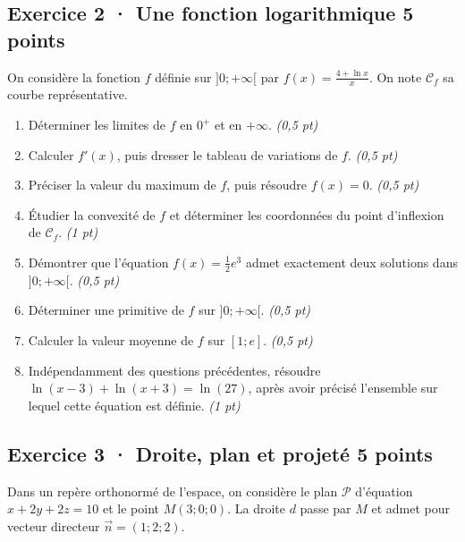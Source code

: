 \subsection*{Exercice 2 · Une fonction logarithmique \hfill 5 points}On considère la fonction $f$ définie sur $]0;+\infty[$ par $f(x)=\frac{4+\ln x}x$. On note $\mathcal C_f$ sa courbe représentative.

\begin{enumerate}

\item Déterminer les limites de $f$ en $0^+$ et en $+\infty$. \hfill\textit{(0{,}5 pt)}

\item Calculer $f' (x)$, puis dresser le tableau de variations de $f$. \hfill\textit{(0{,}5 pt)}

\item Préciser la valeur du maximum de $f$, puis résoudre $f(x)=0$. \hfill\textit{(0{,}5 pt)}

\item Étudier la convexité de $f$ et déterminer les coordonnées du point d'inflexion de $\mathcal C_f$. \hfill\textit{(1 pt)}

\item Démontrer que l'équation $f(x)=\frac12 e^{3}$ admet exactement deux solutions dans $]0;+\infty[$. \hfill\textit{(0{,}5 pt)}

\item Déterminer une primitive de $f$ sur $]0;+\infty[$. \hfill\textit{(0{,}5 pt)}

\item Calculer la valeur moyenne de $f$ sur $[1;e]$. \hfill\textit{(0{,}5 pt)}

\item Indépendamment des questions précédentes, résoudre $\ln(x-3)+\ln(x+3)=\ln(27)$, après avoir précisé l'ensemble sur lequel cette équation est définie. \hfill\textit{(1 pt)}

\end{enumerate}

\mxnewpage{}\par

\subsection*{Exercice 3 · Droite, plan et projeté \hfill 5 points}Dans un repère orthonormé de l'espace, on considère le plan $\mathcal P$ d'équation $x+2y+2z=10$ et le point $M(3;0;0)$. La droite $d$ passe par $M$ et admet pour vecteur directeur $\vec n=(1;2;2)$.

